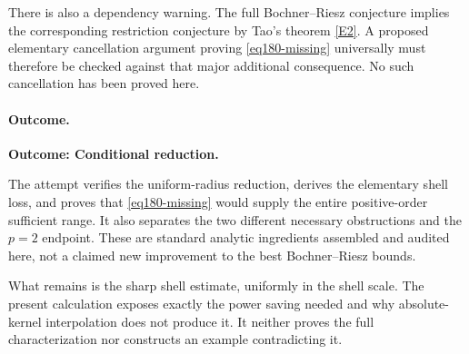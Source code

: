 \documentclass[11pt,a4paper]{article}
\newcommand{\eref}[2]{\hyperlink{extra:#1:#2}{[E#2]}}
\numberwithin{equation}{section}
\begin{document}
There is also a dependency warning. The full Bochner--Riesz conjecture
implies the corresponding restriction conjecture by Tao's theorem
\eref{statement}{2}. A proposed elementary cancellation argument proving
\eqref{eq180-missing} universally must therefore be checked against that
major additional consequence. No such cancellation has been proved here.

\paragraph{Outcome.}
\textbf{Outcome: Conditional reduction.}

The attempt verifies the uniform-radius reduction, derives the elementary
shell loss, and proves that \eqref{eq180-missing} would supply the entire
positive-order sufficient range. It also separates the two different
necessary obstructions and the $p=2$ endpoint. These are standard analytic
ingredients assembled and audited here, not a claimed new improvement to
the best Bochner--Riesz bounds.

What remains is the sharp shell estimate, uniformly in the shell scale.
The present calculation exposes exactly the power saving needed and why
absolute-kernel interpolation does not produce it. It neither proves the
full characterization nor constructs an example contradicting it.
\end{document}
